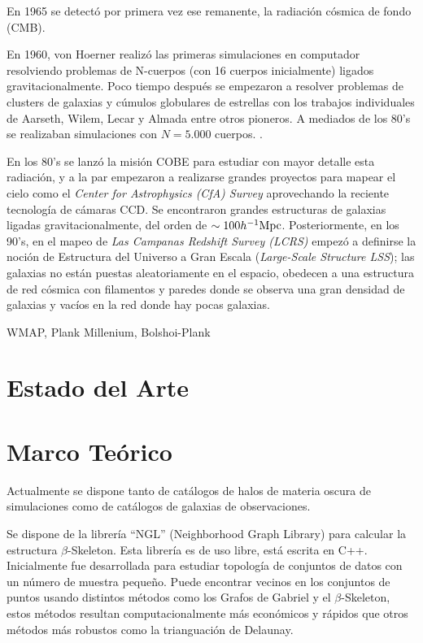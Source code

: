 \documentclass[preprint]{aastex62}
\begin{document}
  En 1965 se detectó por primera vez ese remanente, la radiación cósmica de fondo (CMB).


  En 1960, von Hoerner realizó las primeras simulaciones en computador resolviendo problemas
  de N-cuerpos (con 16 cuerpos inicialmente) ligados gravitacionalmente. Poco tiempo después
  se empezaron a resolver problemas de clusters de galaxias y cúmulos globulares de estrellas
  con los trabajos individuales de Aarseth, Wilem, Lecar y Almada entre otros pioneros. A
  mediados de los 80's se realizaban simulaciones con $N = 5.000$ cuerpos.
  \citep{Aarseth2003}.

  
  
  En los 80's se lanzó la misión COBE para estudiar con mayor detalle esta radiación,
  y a la par empezaron a realizarse grandes proyectos para mapear el cielo como el
  \textit{Center for Astrophysics (CfA) Survey} aprovechando la reciente tecnología de
  cámaras CCD. Se encontraron grandes estructuras de galaxias ligadas gravitacionalmente,
  del orden de $\sim 100 h^{-1}\rm Mpc$.
  Posteriormente, en los 90's, en el mapeo de \textit{Las Campanas Redshift Survey (LCRS)} empezó a
  definirse la noción de Estructura del Universo a Gran Escala (\textit{Large-Scale
    Structure LSS}); las galaxias no están puestas aleatoriamente en el espacio, obedecen
  a una estructura de red cósmica con filamentos y paredes donde se observa una gran
  densidad de galaxias y vacíos en la red donde hay pocas galaxias. \citep{Schneider2014}


    


  WMAP, Plank
  Millenium, Bolshoi-Plank
  
  

  \section{Estado del Arte}

  \section{Marco Teórico}

  Actualmente se dispone tanto de catálogos de halos de materia oscura de simulaciones como de catálogos de galaxias de observaciones.

  Se dispone de la librería ``NGL''\citep{ngl} (Neighborhood Graph Library)
  para calcular la estructura $\beta$-Skeleton. Esta librería es de uso libre, está escrita en C++.
  Inicialmente fue desarrollada para estudiar topología de conjuntos de datos con un número de muestra
  pequeño. Puede encontrar vecinos en los conjuntos de puntos usando distintos métodos como los
  Grafos de Gabriel y el $\beta$-Skeleton, estos métodos resultan computacionalmente más económicos
  y rápidos que otros métodos más robustos como la trianguación de Delaunay.
\end{document}
